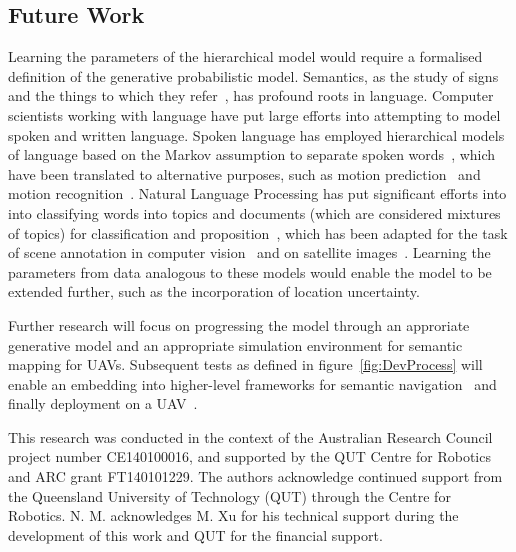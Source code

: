 \documentclass[twocolumn,letterpaper]{IEEEAerospaceCLS}  %
\begin{document}
\subsection{Future Work} \label{ssec:Fut}
Learning the parameters of the hierarchical model would require a formalised definition of the generative probabilistic model. Semantics, as the study of signs and the things to which they refer~\cite{kostavelis_semantic_2015}, has profound roots in language. Computer scientists working with language have put large efforts into attempting to model spoken and written language. Spoken language has employed hierarchical models of language based on the Markov assumption to separate spoken words~\cite{fine_hierarchical_1998,murphy_dynamic_2002}, which have been translated to alternative purposes, such as motion prediction~\cite{li_layered_2015} and motion recognition~\cite{oliver_layered_2002,aarno_layered_2006}. Natural Language Processing has put significant efforts into into classifying words into topics and documents (which are considered mixtures of topics) for classification and proposition~\cite{blei_latent_2003,hofmann_unsupervised_2001}, which has been adapted for the task of scene annotation in computer vision~\cite{bosch_scene_2006,fei-fei_bayesian_2005} and on satellite images~\cite{lienou_semantic_2010}. Learning the parameters from data analogous to these models would enable the model to be extended further, such as the incorporation of location uncertainty.

Further research will focus on progressing the model through an approriate generative model and an appropriate simulation environment for semantic mapping for UAVs. Subsequent tests as defined in figure~\ref{fig:DevProcess} will enable an embedding into higher-level frameworks for semantic navigation~\cite{mandel_towards_2020,vanegas_uncertainty_2016} and finally deployment on a UAV~\cite{mandel_method_2020}.

\acknowledgments
This research was conducted in the context of the Australian Research Council project number CE140100016, and supported by the QUT Centre for Robotics and ARC grant FT140101229. The authors acknowledge continued support from the Queensland University of Technology (QUT) through the Centre for Robotics. N. M. acknowledges M. Xu for his technical support during the development of this work and QUT for the financial support.



\end{document}
